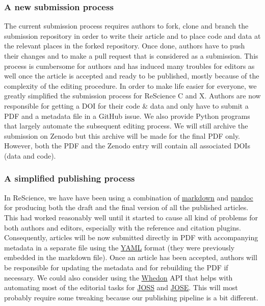 \subsubsection{A new submission process}

The current submission process requires authors to fork, clone and branch the
submission repository in order to write their article and to place code and
data at the relevant places in the forked repository. Once done, authors have
to push their changes and to make a pull request that is considered as a
submission. This process is cumbersome for authors and has induced many
troubles for editors as well once the article is accepted and ready to be
published, mostly because of the complexity of the editing procedure. In order
to make life easier for everyone, we greatly simplified the submission process
for ReScience C and X. Authors are now responsible for getting a DOI for their
code \& data and only have to submit a PDF and a metadata file in a GitHub
issue.
We also provide Python programs that largely automate the subsequent editing
process. We will still archive the submission on Zenodo but this archive will
be made for the final PDF only. However, both the PDF and the Zenodo entry will
contain all associated DOIs (data and code).


\subsubsection{A simplified publishing process}

In ReScience, we have have been using a combination of
\href{https://daringfireball.net/projects/markdown/syntax}{markdown} and
\href{http://pandoc.org/}{pandoc} for producing both the draft and the final
version of all the published articles. This had worked reasonably well until it
started to cause all kind of problems for both authors and editors, especially
with the reference and citation plugins. Consequently, articles will be now
submitted directly in PDF with accompanying metadata in a separate file using
the \href{https://en.wikipedia.org/wiki/YAML}{YAML} format (they were
previously embedded in the markdown file). Once an article has been accepted,
authors will be responsible for updating the metadata and for rebuilding the PDF if
necessary. We could also consider using the
\href{https://github.com/openjournals/whedon}{Whedon} API that helps with automating
most of the editorial tasks for \href{http://joss.theoj.org/}{JOSS} and
\href{http://jose.theoj.org/}{JOSE}. This will most probably require some
tweaking because our publishing pipeline is a bit different.


